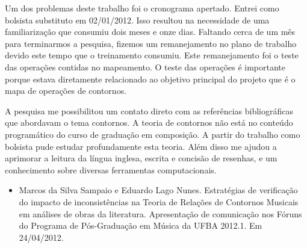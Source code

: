\documentclass[11pt]{article}
\begin{document}
Um dos problemas deste trabalho foi o cronograma apertado.
Entrei como bolsista substituto em 02/01/2012. Isso resultou na
necessidade de uma familiarização que consumiu dois meses e onze dias.
Faltando cerca de um mês para terminarmos a pesquisa, fizemos um
remanejamento no plano de trabalho devido este tempo que o treinamento
consumiu. Este remanejamento foi o teste das operações contidas no
mapeamento. O teste das operações é importante porque estava
diretamente relacionado ao objetivo principal do projeto que é o mapa
de operações de contornos.

A pesquisa me possibilitou um contato direto com as referências
bibliográficas que abordavam o tema contornos.  A teoria de contornos
não está no conteúdo programático do curso de graduação em composição.
A partir do trabalho como bolsista pude estudar profundamente esta
teoria.  Além disso me ajudou a aprimorar a leitura da língua inglesa,
escrita e concisão de resenhas, e um conhecimento sobre diversas
ferramentas computacionais.


\renewcommand{\refname}{Referências bibliográficas (máximo 15)}

\nocite{
  Friedmann1985,
  Friedmann1987,
  Morris1987,
  Marvin1987,
  Marvin1988,
  Polansky1992,
  Morris1993,
  Clifford1995,
  Quinn1997,
  Beard2003,
  Sampaio2008,
  Schultz2008,
  Schultz2009,
  Bor2009
}





\begin{itemize}
\item Marcos da Silva Sampaio e Eduardo Lago Nunes. Estratégias de
  verificação do impacto de inconsistências na Teoria de Relações de
  Contornos Musicais em análises de obras da literatura. Apresentação
  de comunicação nos Fóruns do Programa de Pós-Graduação em Música da
  UFBA 2012.1. Em 24/04/2012.
\end{itemize}

\end{document}
